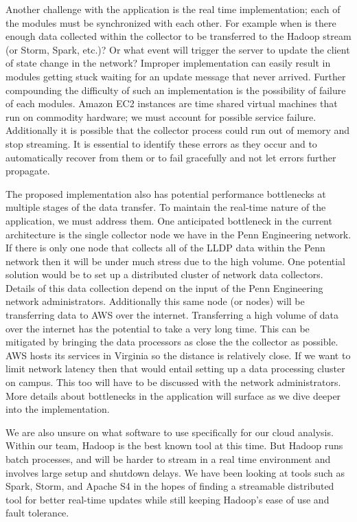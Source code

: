 \documentclass{sig-alternate}
\begin{document}
Another challenge with the application is the real time implementation; each of
the modules must be synchronized with each other. For example when is there
enough data collected within the collector to be transferred to the Hadoop
stream (or Storm, Spark, etc.)? Or what event will trigger the server to update
the client of state change in the network? Improper implementation can easily
result in modules getting stuck waiting for an update message that never
arrived. Further compounding the difficulty of such an implementation is the
possibility of failure of each modules. Amazon EC2 instances are time shared
virtual machines that run on commodity hardware; we must account for possible
service failure. Additionally it is possible that the collector process could
run out of memory and stop streaming. It is essential to identify these errors
as they occur and to automatically recover from them or to fail gracefully and
not let errors further propagate.

The proposed implementation also has potential performance bottlenecks at
multiple stages of the data transfer. To maintain the real-time nature of the
application, we must address them. One anticipated bottleneck in the current
architecture is the single collector node we have in the Penn Engineering
network. If there is only one node that collects all of the LLDP data within the
Penn network then it will be under much stress due to the high volume. One
potential solution would be to set up a distributed cluster of network data
collectors. Details of this data collection depend on the input of the Penn
Engineering network administrators. Additionally this same node (or nodes) will
be transferring data to AWS over the internet. Transferring a high volume of
data over the internet has the potential to take a very long time. This can be
mitigated by bringing the data processors as close the the collector as
possible. AWS hosts its services in Virginia so the distance is relatively
close. If we want to limit network latency then that would entail setting up a
data processing cluster on campus. This too will have to be discussed with the
network administrators. More details about bottlenecks in the application will
surface as we dive deeper into the implementation.

We are also unsure on what software to use specifically for our cloud analysis.
Within our team, Hadoop is the best known tool at this time. But Hadoop runs
batch processes, and will be harder to stream in a real time environment and
involves large setup and shutdown delays. We have been looking at tools such as
Spark, Storm, and Apache S4 in the hopes of finding a streamable distributed
tool for better real-time updates while still keeping Hadoop's ease of use and
fault tolerance.
\end{document}
